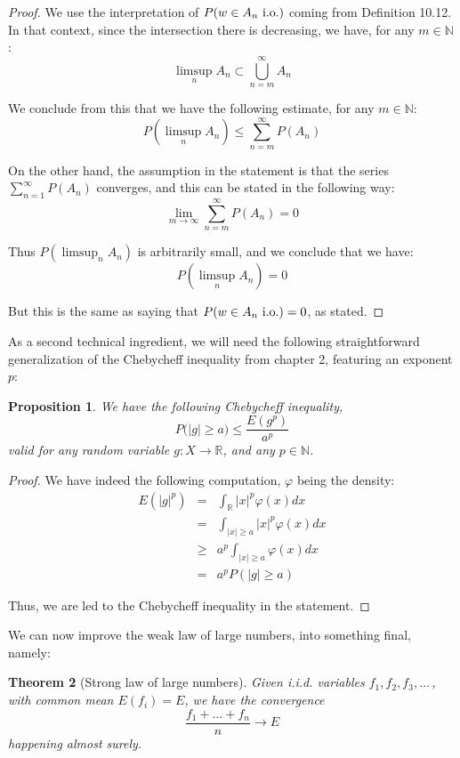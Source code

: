 \documentclass[12pt]{amsbook}
\newtheorem{theorem}{Theorem}[chapter]
\newtheorem{proposition}[theorem]{Proposition}
\begin{document}
\begin{proof}
We use the interpretation of $P(w\in A_n\ {\rm i.o.})$ coming from Definition 10.12. In that context, since the intersection there is decreasing, we have, for any $m\in\mathbb N$:
$$\limsup_nA_n\subset\bigcup_{n=m}^\infty A_n$$

We conclude from this that we have the following estimate, for any $m\in\mathbb N$:
$$P(\limsup_nA_n)\leq\sum_{n=m}^\infty P(A_n)$$

On the other hand, the assumption in the statement is that the series $\sum_{n=1}^\infty P(A_n)$ converges, and this can be stated in the following way:
$$\lim_{m\to\infty}\sum_{n=m}^\infty P(A_n)=0$$

Thus $P(\limsup_nA_n)$ is arbitrarily small, and we conclude that we have:
$$P(\limsup_nA_n)=0$$

But this is the same as saying that $P(w\in A_n\ {\rm i.o.})=0$, as stated.
\end{proof}

As a second technical ingredient, we will need the following straightforward generalization of the Chebycheff inequality from chapter 2, featuring an exponent $p$:


\begin{proposition}
We have the following Chebycheff inequality,
$$P\big(|g|\geq a\big)\leq\frac{E(g^p)}{a^p}$$
valid for any random variable $g:X\to\mathbb R$, and any $p\in\mathbb N$.
\end{proposition}

\begin{proof}
We have indeed the following computation, $\varphi$ being the density:
\begin{eqnarray*}
E(|g|^p)
&=&\int_\mathbb R|x|^p\varphi(x)dx\\
&=&\int_{|x|\geq a}|x|^p\varphi(x)dx\\
&\geq&a^p\int_{|x|\geq a}\varphi(x)dx\\
&=&a^pP(|g|\geq a)
\end{eqnarray*}

Thus, we are led to the Chebycheff inequality in the statement.
\end{proof}

We can now improve the weak law of large numbers, into something final, namely:


\begin{theorem}[Strong law of large numbers]
Given i.i.d. variables $f_1,f_2,f_3,\ldots\,$, with common mean $E(f_i)=E$, we have the convergence
$$\frac{f_1+\ldots+f_n}{n}\to E$$
happening almost surely.
\end{theorem}
\end{document}

